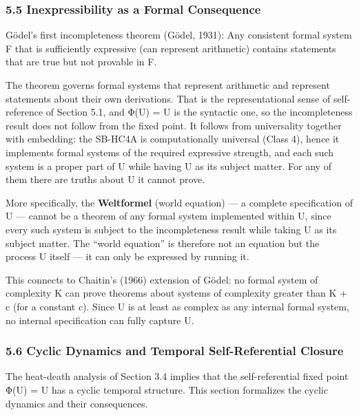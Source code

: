 \documentclass[
]{article}
\begin{document}
\hypertarget{inexpressibility-as-a-formal-consequence}{%
\subsubsection{5.5 Inexpressibility as a Formal
Consequence}\label{inexpressibility-as-a-formal-consequence}}

Gödel's first incompleteness theorem (Gödel, 1931): Any consistent
formal system F that is sufficiently expressive (can represent
arithmetic) contains statements that are true but not provable in F.

The theorem governs formal systems that represent arithmetic and
represent statements about their own derivations. That is the
representational sense of self-reference of Section 5.1, and Φ(U) = U is
the syntactic one, so the incompleteness result does not follow from the
fixed point. It follows from universality together with embedding: the
SB-HC4A is computationally universal (Class 4), hence it implements
formal systems of the required expressive strength, and each such system
is a proper part of U while having U as its subject matter. For any of
them there are truths about U it cannot prove.

More specifically, the \textbf{Weltformel} (world equation) --- a
complete specification of U --- cannot be a theorem of any formal system
implemented within U, since every such system is subject to the
incompleteness result while taking U as its subject matter. The ``world
equation'' is therefore not an equation but the process U itself --- it
can only be expressed by running it.

This connects to Chaitin's (1966) extension of Gödel: no formal system
of complexity K can prove theorems about systems of complexity greater
than K + c (for a constant c). Since U is at least as complex as any
internal formal system, no internal specification can fully capture U.

\hypertarget{cyclic-dynamics-and-temporal-self-referential-closure}{%
\subsubsection{5.6 Cyclic Dynamics and Temporal Self-Referential
Closure}\label{cyclic-dynamics-and-temporal-self-referential-closure}}

The heat-death analysis of Section 3.4 implies that the self-referential
fixed point Φ(U) = U has a cyclic temporal structure. This section
formalizes the cyclic dynamics and their consequences.
\end{document}
